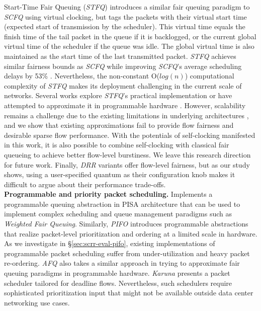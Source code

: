 Start-Time Fair Queuing (\textit{STFQ}) \cite{stfq} introduces a similar fair queuing paradigm to \textit{SCFQ} using virtual clocking, but tags the packets with their virtual start time (expected start of transmission by the scheduler). This virtual time equals the finish time of the tail packet in the queue if it is backlogged, or the current global virtual time of the scheduler if the queue was idle. The global virtual time is also maintained as the start time of the last transmitted packet.
\textit{STFQ} achieves similar fairness bounds as \textit{SCFQ} while improving \textit{SCFQ}'s average scheduling delays by 53\% \cite{stfq}. Nevertheless, the non-constant O($log(n)$) computational complexity of \textit{STFQ} makes its deployment challenging in the current scale of networks. Several works explore \textit{STFQ}'s practical implementation \cite{flow-aware,ibis,mqfq} or have attempted to approximate it in programmable hardware \cite{aifo,numfabric,sppifo}. However, scalability remains a challenge due to the existing limitations in underlying architectures \cite{pifo,mqfq}, and we show that existing approximations fail to provide flow fairness and desirable sparse flow performance.
With the potentials of self-clocking manifested in this work, it is also possible to combine self-clocking with classical fair queueing to achieve better flow-level burstiness. We leave this research direction for future work.
Finally, \textit{DRR} variants \cite{drr,strr,aliquem} offer flow-level fairness, but as our study shows, using a user-specified quantum as their configuration knob makes it difficult to argue about their performance trade-offs.
\\
\textbf{Programmable and priority packet scheduling.}
\cite{calendar} Implements a programmable queuing abstraction in PISA architecture that can be used to implement complex scheduling and queue management paradigms such as \textit{Weighted Fair Queuing}. Similarly, \textit{PIFO} \cite{pifo} introduces programmable abstractions that realize packet-level prioritization and ordering at a limited scale in hardware. As we investigate in \S\ref{sec:scrr-eval-pifo}, existing implementations of programmable packet scheduling suffer from under-utilization and heavy packet re-ordering.
\textit{AFQ} \cite{afq} also takes a similar approach in trying to approximate fair queuing paradigms in programmable hardware. \textit{Karuna} \cite{karuna} presents a packet scheduler tailored for deadline flows.
Nevertheless, such schedulers require sophisticated prioritization input that might not be available outside data center networking use cases. 
